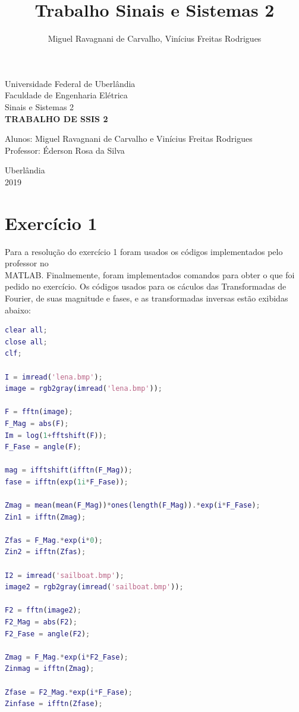 \documentclass{article}[a4paper,12pt,twoside]
\title{Trabalho Sinais e Sistemas 2}
\author{Miguel Ravagnani de Carvalho, Vinícius Freitas Rodrigues}
\date{}
\begin{document}
\begin{titlepage}
    \begin{center}
        {\large Universidade Federal de Uberlândia}\\[0.2cm]
        {\large Faculdade de Engenharia Elétrica}\\[0.2cm]
        {\large Sinais e Sistemas 2}\\[5.5cm]
        {\bf \huge TRABALHO DE SSIS 2}\\[5.1cm]
    \end{center}
    {\large Alunos: Miguel Ravagnani de Carvalho e Vinícius Freitas Rodrigues}\\
    {\large Professor: Éderson Rosa da Silva}\\[5.1cm]
    \begin{center}
        {\large Uberlândia}\\
        {\large 2019}
    \end{center}
\end{titlepage}


\maketitle
\tableofcontents
\newpage

\section{Exercício 1}
Para a resolução do exercício 1 foram usados os códigos implementados pelo professor no \\MATLAB. Finalmemente, foram implementados comandos para obter o que foi pedido no exercício.
\newline
Os códigos usados para os cáculos das Transformadas de Fourier, de suas magnitude e fases, e as transformadas inversas estão exibidas abaixo:\newline

\begin{lstlisting}[language=Matlab]
clear all;
close all;
clf;

I = imread('lena.bmp');
image = rgb2gray(imread('lena.bmp'));

F = fftn(image);
F_Mag = abs(F);
Im = log(1+fftshift(F));
F_Fase = angle(F);

mag = ifftshift(ifftn(F_Mag));
fase = ifftn(exp(1i*F_Fase));

Zmag = mean(mean(F_Mag))*ones(length(F_Mag)).*exp(i*F_Fase);
Zin1 = ifftn(Zmag);

Zfas = F_Mag.*exp(i*0);
Zin2 = ifftn(Zfas);

I2 = imread('sailboat.bmp');
image2 = rgb2gray(imread('sailboat.bmp'));

F2 = fftn(image2);
F2_Mag = abs(F2);
F2_Fase = angle(F2);

Zmag = F_Mag.*exp(i*F2_Fase);
Zinmag = ifftn(Zmag);

Zfase = F2_Mag.*exp(i*F_Fase);
Zinfase = ifftn(Zfase);
\end{lstlisting}
\end{document}
